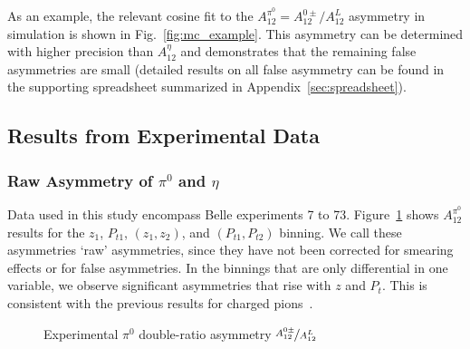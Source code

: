 As an example, the relevant cosine fit to the $A_{12}^{\pi^0}=A_{12}^{0\pm}/A_{12}^L$ asymmetry in simulation is shown in Fig.~\ref{fig:mc_example}. 
This asymmetry can be determined with  higher precision than $A_{12}^{\eta}$ and demonstrates that the remaining false asymmetries are small (detailed results on all false asymmetry can be found in the supporting spreadsheet summarized in Appendix~\ref{sec:spreadsheet}).




\subsection{Results from Experimental Data}
\label{sec:resultsfromexp}
\subsubsection{\texorpdfstring{Raw Asymmetry of $\pi^0$ and $\eta$}{Raw Asymmetry of pi0 and eta}}
Data used in this study encompass Belle experiments  7 to 73.
Figure~\ref{fig:exp_pi0_result} shows  $A_{12}^{\pi^0}$ results for the $z_1$, $P_{t1}$, $(z_1,z_2)$, and $(P_{t1},P_{t2})$ binning. We call these asymmetries `raw' asymmetries, since they have not been corrected for smearing effects or for false asymmetries. 
In the binnings that are only differential in one variable, we observe significant asymmetries that rise with $z$ and $P_{t}$. This is consistent with the previous results for charged pions~\cite{ChargedPionResult2, ChargedPionResult}.

\begin{figure}[t]
  \centering     
  \caption{Experimental $\pi^0$ double-ratio asymmetry $\nicefrac{A^{0\pm}_{12}}{A^L_{12}}$}
  \label{fig:exp_pi0_result}
\end{figure}

